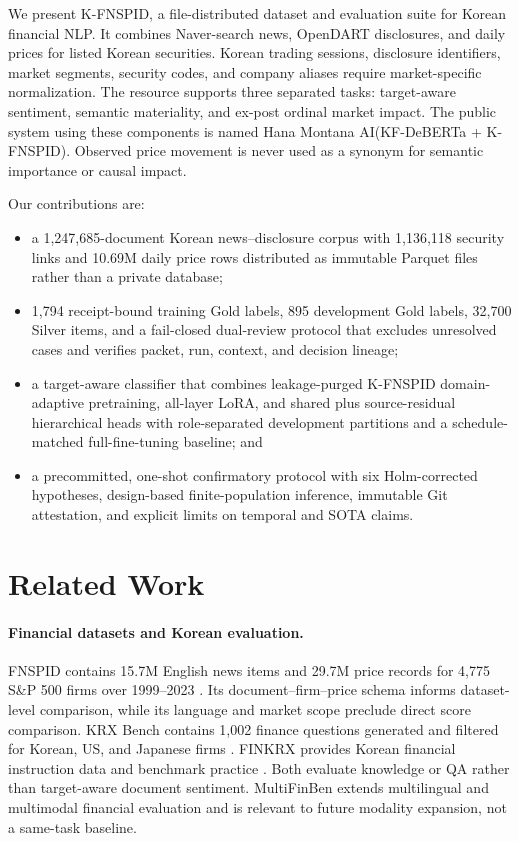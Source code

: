 \documentclass[11pt]{article}
\newcommand{\dataset}{K-FNSPID}
\newcommand{\system}{Hana Montana AI(KF-DeBERTa + K-FNSPID)}
\begin{document}
We present \dataset, a file-distributed dataset and evaluation suite for Korean financial NLP. It combines Naver-search news, OpenDART disclosures, and daily prices for listed Korean securities. Korean trading sessions, disclosure identifiers, market segments, security codes, and company aliases require market-specific normalization. The resource supports three separated tasks: target-aware sentiment, semantic materiality, and ex-post ordinal market impact. The public system using these components is named \system. Observed price movement is never used as a synonym for semantic importance or causal impact.

Our contributions are:
\begin{itemize}
  \item a 1,247,685-document Korean news--disclosure corpus with 1,136,118 security links and 10.69M daily price rows distributed as immutable Parquet files rather than a private database;
  \item 1,794 receipt-bound training Gold labels, 895 development Gold labels, 32,700 Silver items, and a fail-closed dual-review protocol that excludes unresolved cases and verifies packet, run, context, and decision lineage;
  \item a target-aware classifier that combines leakage-purged K-FNSPID domain-adaptive pretraining, all-layer LoRA, and shared plus source-residual hierarchical heads with role-separated development partitions and a schedule-matched full-fine-tuning baseline; and
  \item a precommitted, one-shot confirmatory protocol with six Holm-corrected hypotheses, design-based finite-population inference, immutable Git attestation, and explicit limits on temporal and SOTA claims.
\end{itemize}

\section{Related Work}

\paragraph{Financial datasets and Korean evaluation.}
FNSPID contains 15.7M English news items and 29.7M price records for 4,775 S\&P 500 firms over 1999--2023 \citep{dong-etal-2024-fnspid}. Its document--firm--price schema informs dataset-level comparison, while its language and market scope preclude direct score comparison. KRX Bench contains 1,002 finance questions generated and filtered for Korean, US, and Japanese firms \citep{son-etal-2024-krx}. FINKRX provides Korean financial instruction data and benchmark practice \citep{son-etal-2025-finkrx}. Both evaluate knowledge or QA rather than target-aware document sentiment. MultiFinBen extends multilingual and multimodal financial evaluation \citep{peng-etal-2026-multifinben} and is relevant to future modality expansion, not a same-task baseline.
\end{document}
